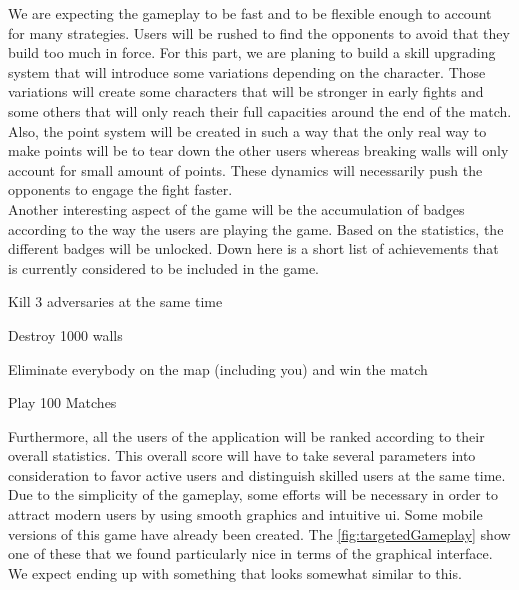 We are expecting the gameplay to be fast and to be flexible enough to account for many strategies. Users will be rushed to find the opponents to avoid that they build too much in force. For this part, we are planing to build a skill upgrading system that will introduce some variations depending on the character. Those variations will create some characters that will be stronger in early fights and some others that will only reach their full capacities around the end of the match. Also, the point system will be created in such a way that the only real way to make points will be to tear down the other users whereas breaking walls will only account for small amount of points. These dynamics will necessarily push the opponents to engage the fight faster. \\

Another interesting aspect of the game will be the accumulation of badges according to the way the users are playing the game. Based on the statistics, the different badges will be unlocked. Down here is a short list of achievements that is currently considered to be included in the game.
\begin{multicols}{2}
  \begin{description}[style=nextline]
    \item [Collateral Damage] Kill 3 adversaries at the same time
    \item [Excavator] Destroy 1000 walls
    \item [Kamikaze] Eliminate everybody on the map (including you) and win the match
    \item [Veteran] Play 100 Matches
  \end{description}
\end{multicols}
Furthermore, all the users of the application will be ranked according to their overall statistics. This overall score will have to take several parameters into consideration to favor active users and distinguish skilled users at the same time. \\

Due to the simplicity of the gameplay, some efforts will be necessary in order to attract modern users by using smooth graphics and intuitive \gls{ui}. Some mobile versions of this game have already been created. The \autoref{fig:targetedGameplay} show one of these that we found particularly nice in terms of the graphical interface. We expect ending up with something that looks somewhat similar to this.

